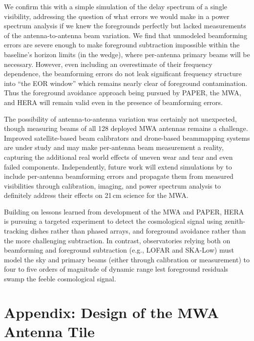 We confirm this with a simple simulation of the delay spectrum of a single visibility, addressing the question of what errors we would make in a power spectrum analysis if we knew the foregrounds perfectly but lacked measurements of the antenna-to-antenna beam variation. We find that unmodeled beamforming errors are severe enough to make foreground subtraction impossible within the baseline's horizon limits (in the wedge), where per-antenna primary beams will be necessary. However, even including an overestimate of their frequency dependence, the beamforming errors do not leak significant frequency structure into ``the EOR window'' which remains nearly clear of foreground contamination. Thus the foreground avoidance approach being pursued by PAPER, the MWA, and HERA will remain valid even in the presence of beamforming errors.

The possibility of antenna-to-antenna variation was certainly not unexpected, though measuring beams of all 128 deployed MWA antennas remains a challenge. Improved satellite-based beam calibrators and drone-based beammapping systems are under study and may make per-antenna beam measurement a reality, capturing the additional real world effects of uneven wear and tear and even failed components. Independently, future work will extend simulations by \citet{nithya15} to include per-antenna beamforming errors and propagate them from measured visibilities through calibration, imaging, and power spectrum analysis to definitely address their effects on 21\,cm science for the MWA. 

Building on lessons learned from development of the MWA and PAPER, HERA is pursuing a targeted experiment to detect the cosmological signal using zenith-tracking dishes rather than phased arrays, and foreground avoidance rather than the more challenging subtraction. In contrast, observatories relying both on beamforming and foreground subtraction (e.g., LOFAR and SKA-Low) must model the sky and primary beams (either through calibration or measurement) to four to five orders of magnitude of dynamic range lest foreground residuals swamp the feeble cosmological signal.


\section{Appendix: Design of the MWA Antenna Tile}

